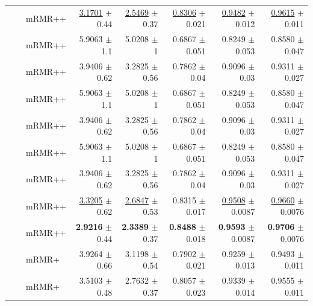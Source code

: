\begin{longtable}{llp{}rrrrr}
 &  & mRMR++ & \underline{3.1701} {\scriptsize $\pm$ 0.44} & \underline{2.5469} {\scriptsize $\pm$ 0.37} & \underline{0.8306} {\scriptsize $\pm$ 0.021} & \underline{0.9482} {\scriptsize $\pm$ 0.012} & \underline{0.9615} {\scriptsize $\pm$ 0.011} \\
 &  & mRMR++ & 5.9063 {\scriptsize $\pm$ 1.1} & 5.0208 {\scriptsize $\pm$ 1} & 0.6867 {\scriptsize $\pm$ 0.051} & 0.8249 {\scriptsize $\pm$ 0.053} & 0.8580 {\scriptsize $\pm$ 0.047} \\
 &  & mRMR++ & 3.9406 {\scriptsize $\pm$ 0.62} & 3.2825 {\scriptsize $\pm$ 0.56} & 0.7862 {\scriptsize $\pm$ 0.04} & 0.9096 {\scriptsize $\pm$ 0.03} & 0.9311 {\scriptsize $\pm$ 0.027} \\
 &  & mRMR++ & 5.9063 {\scriptsize $\pm$ 1.1} & 5.0208 {\scriptsize $\pm$ 1} & 0.6867 {\scriptsize $\pm$ 0.051} & 0.8249 {\scriptsize $\pm$ 0.053} & 0.8580 {\scriptsize $\pm$ 0.047} \\
 &  & mRMR++ & 3.9406 {\scriptsize $\pm$ 0.62} & 3.2825 {\scriptsize $\pm$ 0.56} & 0.7862 {\scriptsize $\pm$ 0.04} & 0.9096 {\scriptsize $\pm$ 0.03} & 0.9311 {\scriptsize $\pm$ 0.027} \\
 &  & mRMR++ & 5.9063 {\scriptsize $\pm$ 1.1} & 5.0208 {\scriptsize $\pm$ 1} & 0.6867 {\scriptsize $\pm$ 0.051} & 0.8249 {\scriptsize $\pm$ 0.053} & 0.8580 {\scriptsize $\pm$ 0.047} \\
 &  & mRMR++ & 3.9406 {\scriptsize $\pm$ 0.62} & 3.2825 {\scriptsize $\pm$ 0.56} & 0.7862 {\scriptsize $\pm$ 0.04} & 0.9096 {\scriptsize $\pm$ 0.03} & 0.9311 {\scriptsize $\pm$ 0.027} \\
 &  & mRMR++ & \underline{3.3205} {\scriptsize $\pm$ 0.62} & \underline{2.6847} {\scriptsize $\pm$ 0.53} & 0.8315 {\scriptsize $\pm$ 0.017} & \underline{0.9508} {\scriptsize $\pm$ 0.0087} & \underline{0.9660} {\scriptsize $\pm$ 0.0076} \\
 &  & mRMR++ & \textbf{2.9216} {\scriptsize $\pm$ 0.44} & \textbf{2.3389} {\scriptsize $\pm$ 0.37} & \textbf{0.8488} {\scriptsize $\pm$ 0.018} & \textbf{0.9593} {\scriptsize $\pm$ 0.0087} & \textbf{0.9706} {\scriptsize $\pm$ 0.0076} \\
 &  & mRMR+ & 3.9264 {\scriptsize $\pm$ 0.66} & 3.1198 {\scriptsize $\pm$ 0.54} & 0.7902 {\scriptsize $\pm$ 0.021} & 0.9259 {\scriptsize $\pm$ 0.013} & 0.9493 {\scriptsize $\pm$ 0.011} \\
 &  & mRMR+ & 3.5103 {\scriptsize $\pm$ 0.48} & 2.7632 {\scriptsize $\pm$ 0.37} & 0.8057 {\scriptsize $\pm$ 0.023} & 0.9339 {\scriptsize $\pm$ 0.014} & 0.9555 {\scriptsize $\pm$ 0.011} \\

\end{longtable}
